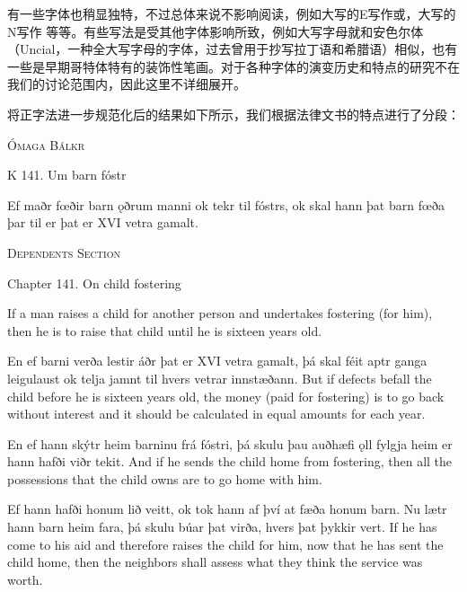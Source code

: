 有一些字体也稍显独特，不过总体来说不影响阅读，例如大写的E写作\Eunical 或\Eclosedunical ，大写的N写作{\Large{\nwithdescender}} 等等。有些写法是受其他字体影响所致，例如大写字母就和安色尔体（Uncial，一种全大写字母的字体，过去曾用于抄写拉丁语和希腊语）相似，也有一些是早期哥特体特有的装饰性笔画。对于各种字体的演变历史和特点的研究不在我们的讨论范围内，因此这里不详细展开。

将正字法进一步规范化后的结果如下所示，我们根据法律文书的特点进行了分段：
\begin{paracol}{2}
    \begin{center}
        \textsc{Ómaga Bálkr}

        K 141. Um barn fóstr
    \end{center}

    Ef maðr fœðir barn ǫðrum manni ok tekr til fóstrs, ok skal hann þat barn fœða þar til er þat er XVI vetra gamalt.
    \switchcolumn
    \begin{center}
        \textsc{Dependents Section}

        Chapter 141. On child fostering
    \end{center}

    If a man raises a child for another person and undertakes fostering (for him), then he is to raise that child until he is sixteen years old.
\end{paracol}
\begin{paracol}{2}
    En ef barni verða lestir áðr þat er XVI vetra gamalt, þá skal féit aptr ganga leigulaust ok telja jamnt til hvers vetrar innstæðann.
    \switchcolumn
    But if defects befall the child before he is sixteen years old, the money (paid for fostering) is to go back without interest and it should be calculated in equal amounts for each year.
\end{paracol}

\begin{paracol}{2}
    En ef hann skýtr heim barninu frá fóstri, þá skulu þau auðhæfi ǫll fylgja heim er hann hafði viðr tekit.
    \switchcolumn
    And if he sends the child home from fostering, then all the possessions that the child owns are to go home with him.
\end{paracol}
\begin{paracol}{2}
    Ef hann hafði honum lið veitt, ok tok hann af því at fæða honum barn. Nu lætr hann barn heim fara, þá skulu búar þat virða, hvers þat þykkir vert.
    \switchcolumn
    If he has come to his aid and therefore raises the child for him, now that he has sent the child home, then the neighbors shall assess what they think the service was worth.
\end{paracol}

